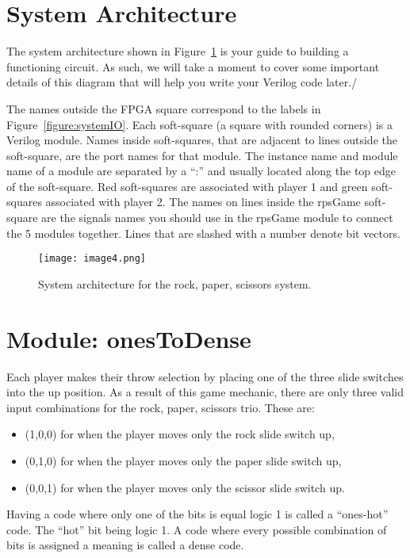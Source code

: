 \section{System Architecture}
The system architecture shown in Figure~\ref{fig:sysArch} is your guide to building
a functioning circuit. As such, we will take a moment to cover some important
details of this diagram that will help you write your Verilog code later./

The names outside
the FPGA square correspond to the labels in Figure~\ref{figure:systemIO}. Each soft-square
(a square with rounded corners) is a Verilog module. Names inside
soft-squares, that are adjacent to lines outside the soft-square, are
the port names for that module. The instance name and module name of a
module are separated by a ``:'' and usually located along the top edge
of the soft-square. Red soft-squares are associated with player 1 and
green soft-squares associated with player 2. The names on lines inside
the rpsGame soft-square are the signals names you should use in the
rpsGame module to connect the 5 modules together. Lines that are slashed
with a number denote bit vectors.

\begin{figure}[ht]
    \texttt{[image:  image4.png]}
    \caption{System architecture for the rock, paper, scissors system.}
    \label{fig:sysArch}
\end{figure}

\hypertarget{onestodense-module}{%
    \section{Module: onesToDense}
\label{onestodense-module}}

Each player makes their throw selection by placing one of the three
slide switches into the up position. As a result of this game mechanic,
there are only three valid input combinations for the rock, paper,
scissors trio. These are:

\begin{itemize}
    \item
        (1,0,0) for when the player moves only the rock slide switch up,
    \item
        (0,1,0) for when the player moves only the paper slide switch up,
    \item
        (0,0,1) for when the player moves only the scissor slide switch up.
\end{itemize}

Having a code where only one of the bits is equal logic 1 is called a
``ones-hot'' code. The ``hot'' bit being logic 1. A code where every
possible combination of bits is assigned a meaning is called a dense
code.

